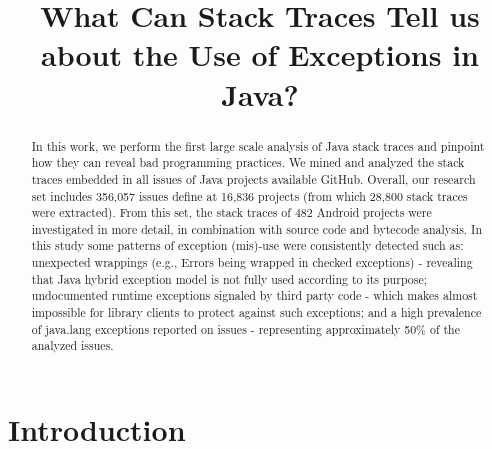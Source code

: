 \documentclass[conference]{IEEEtran}
\begin{document}
\title{What Can Stack Traces Tell us about the Use of Exceptions in Java?}

\author{
}

\newcommand{\todo}[1]{\textbf{TODO}\footnote{\textbf{TODO:} #1}}

\maketitle

\begin{abstract}
In this work, we perform the first large scale analysis of Java stack traces and pinpoint how they can reveal bad programming practices. We mined and analyzed the stack traces embedded in all issues of Java projects available GitHub. Overall, our research set includes 356,057 issues define at 16,836 projects (from which 28,800 stack traces were extracted). From this set, the stack traces of 482 Android projects were investigated in more detail, in combination with source code and bytecode analysis. In this study some patterns of exception (mis)-use were consistently detected such as: unexpected wrappings (e.g., Errors being wrapped in checked exceptions) - revealing that Java hybrid exception model is not fully used according to its purpose;  undocumented runtime exceptions signaled by third party code - which makes almost impossible for library clients to protect against such exceptions; and a high prevalence of java.lang exceptions reported on issues - representing approximately 50\% of the analyzed issues.


\end{abstract}


\section{Introduction}
\end{document}

